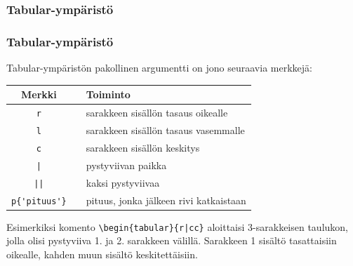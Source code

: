 \documentclass[handout,hyperref={colorlinks=true}]{beamer}
\theoremstyle{remark}
\newcommand{\vaihto}{\\ \vspace{10pt}}
\begin{document}
\subsubsection{Tabular-ympäristö}
\begin{frame}[fragile]
    \frametitle{Tabular-ympäristö}
    Tabular-ympäristön pakollinen argumentti on jono seuraavia merkkejä:
    \begin{table}[h!]
        \begin{scriptsize}
            \begin{tabular}{ccp{5cm}}
                Merkki && Toiminto\\
                \hline
                \verb-r- && sarakkeen sisällön tasaus oikealle\\
                \hline
                \verb-l- && sarakkeen sisällön tasaus vasemmalle\\
                \hline
                \verb-c- && sarakkeen sisällön keskitys\\
                \hline
                \verb-|- && pystyviivan paikka\\
                \hline
                \verb-||- && kaksi pystyviivaa\\
                \hline
                \verb-p{'pituus'}- && pituus, jonka jälkeen rivi katkaistaan\\
                \hline
            \end{tabular}
        \end{scriptsize}
    \end{table}
    Esimerkiksi komento \verb-\begin{tabular}{r|cc}- aloittaisi 3-sarakkeisen taulukon, jolla olisi pystyviiva 1. ja 2. sarakkeen välillä. Sarakkeen 1 sisältö tasattaisiin oikealle, kahden muun sisältö keskitettäisiin.
\end{frame}
\end{document}
